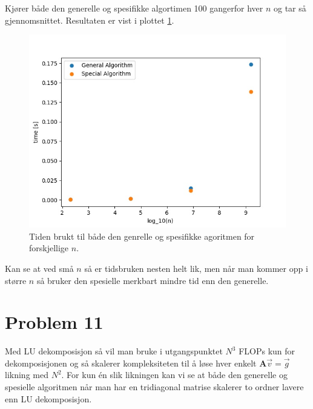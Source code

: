 \documentclass[english,notitlepage]{revtex4-1}  %
\begin{document}
Kjører både den generelle og spesifikke algortimen 100 gangerfor hver $n$ og tar så gjennomsnittet. Resultaten er vist i plottet \ref{timeplot}.

\begin{figure}
\centering
\includegraphics[scale=0.65]{plottime.jpg}
\caption{Tiden brukt til både den genrelle og spesifikke agoritmen for forskjellige $n$.}
\label{timeplot}
\end{figure}

Kan se at ved små $n$ så er tidsbruken nesten helt lik, men når man kommer opp i større $n$ så bruker den spesielle merkbart mindre tid enn den generelle.

\section*{Problem 11}

Med LU dekomposisjon så vil man bruke i utgangspunktet $N^3$ FLOPs kun for dekomposisjonen og så skalerer kompleksiteten til å løse hver enkelt $\textbf{A}\vec{v}= \vec{g}$ likning med $N^2$. For kun én slik likningen kan vi se at både den generelle og spesielle algoritmen når man har en tridiagonal matrise skalerer to ordner lavere enn LU dekomposisjon.
\end{document}
